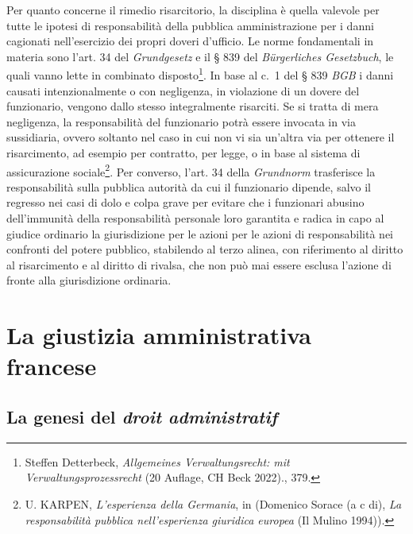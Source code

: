 \documentclass[12pt,it,a4paper,]{report}
\begin{document}
Per quanto concerne il rimedio risarcitorio, la disciplina è quella
valevole per tutte le ipotesi di responsabilità della pubblica
amministrazione per i danni cagionati nell'esercizio dei propri doveri
d'ufficio. Le norme fondamentali in materia sono l'art. 34 del
\emph{Grundgesetz} e il § 839 del \emph{Bürgerliches Gesetzbuch}, le
quali vanno lette in combinato disposto\footnote{{Steffen Detterbeck,
  \emph{Allgemeines Verwaltungsrecht: mit Verwaltungsprozessrecht} (20
  Auflage, {CH Beck} 2022).}, 379.}. In base al c.~1 del § 839
\emph{BGB} i danni causati intenzionalmente o con negligenza, in
violazione di un dovere del funzionario, vengono dallo stesso
integralmente risarciti. Se si tratta di mera negligenza, la
responsabilità del funzionario potrà essere invocata in via sussidiaria,
ovvero soltanto nel caso in cui non vi sia un'altra via per ottenere il
risarcimento, ad esempio per contratto, per legge, o in base al sistema
di assicurazione sociale\footnote{U. KARPEN, \emph{L'esperienza della
  Germania}, in (Domenico Sorace (a c di), \emph{La responsabilità
  pubblica nell'esperienza giuridica europea} ({Il Mulino} 1994)).}. Per
converso, l'art. 34 della \emph{Grundnorm} trasferisce la responsabilità
sulla pubblica autorità da cui il funzionario dipende, salvo il regresso
nei casi di dolo e colpa grave per evitare che i funzionari abusino
dell'immunità della responsabilità personale loro garantita e radica in
capo al giudice ordinario la giurisdizione per le azioni per le azioni
di responsabilità nei confronti del potere pubblico, stabilendo al terzo
alinea, con riferimento al diritto al risarcimento e al diritto di
rivalsa, che non può mai essere esclusa l'azione di fronte alla
giurisdizione ordinaria.

\hypertarget{la-giustizia-amministrativa-francese}{%
\chapter{La giustizia amministrativa
francese}\label{la-giustizia-amministrativa-francese}}

\hypertarget{la-genesi-del-droit-administratif}{%
\section{\texorpdfstring{La genesi del \emph{droit
administratif}}{La genesi del droit administratif}}\label{la-genesi-del-droit-administratif}}
\end{document}

